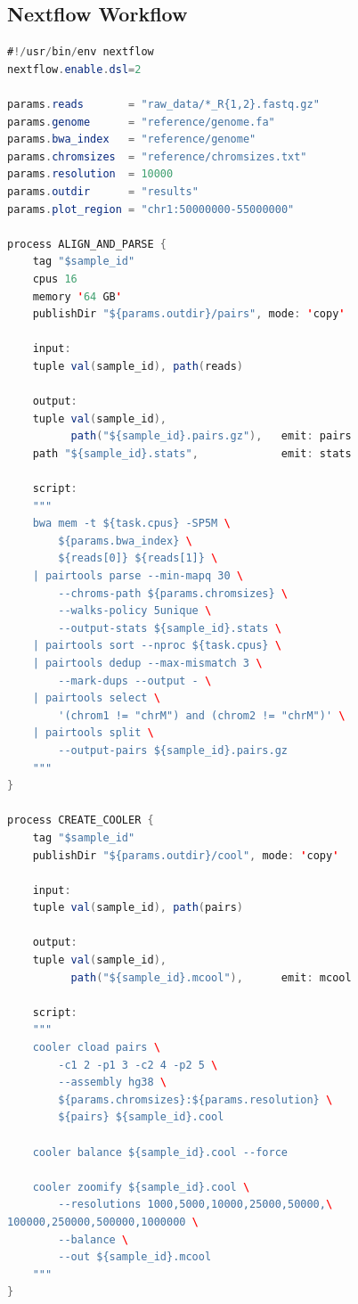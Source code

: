 \subsection{Nextflow Workflow}
\label{subsec:3dgenome:nextflow}

\begin{lstlisting}[language=Java, caption={Nextflow DSL2 workflow for Hi-C analysis.}, label={lst:3dgenome:nextflow}]
#!/usr/bin/env nextflow
nextflow.enable.dsl=2

params.reads       = "raw_data/*_R{1,2}.fastq.gz"
params.genome      = "reference/genome.fa"
params.bwa_index   = "reference/genome"
params.chromsizes  = "reference/chromsizes.txt"
params.resolution  = 10000
params.outdir      = "results"
params.plot_region = "chr1:50000000-55000000"

process ALIGN_AND_PARSE {
    tag "$sample_id"
    cpus 16
    memory '64 GB'
    publishDir "${params.outdir}/pairs", mode: 'copy'

    input:
    tuple val(sample_id), path(reads)

    output:
    tuple val(sample_id),
          path("${sample_id}.pairs.gz"),   emit: pairs
    path "${sample_id}.stats",             emit: stats

    script:
    """
    bwa mem -t ${task.cpus} -SP5M \
        ${params.bwa_index} \
        ${reads[0]} ${reads[1]} \
    | pairtools parse --min-mapq 30 \
        --chroms-path ${params.chromsizes} \
        --walks-policy 5unique \
        --output-stats ${sample_id}.stats \
    | pairtools sort --nproc ${task.cpus} \
    | pairtools dedup --max-mismatch 3 \
        --mark-dups --output - \
    | pairtools select \
        '(chrom1 != "chrM") and (chrom2 != "chrM")' \
    | pairtools split \
        --output-pairs ${sample_id}.pairs.gz
    """
}

process CREATE_COOLER {
    tag "$sample_id"
    publishDir "${params.outdir}/cool", mode: 'copy'

    input:
    tuple val(sample_id), path(pairs)

    output:
    tuple val(sample_id),
          path("${sample_id}.mcool"),      emit: mcool

    script:
    """
    cooler cload pairs \
        -c1 2 -p1 3 -c2 4 -p2 5 \
        --assembly hg38 \
        ${params.chromsizes}:${params.resolution} \
        ${pairs} ${sample_id}.cool

    cooler balance ${sample_id}.cool --force

    cooler zoomify ${sample_id}.cool \
        --resolutions 1000,5000,10000,25000,50000,\
100000,250000,500000,1000000 \
        --balance \
        --out ${sample_id}.mcool
    """
}


\end{lstlisting}
